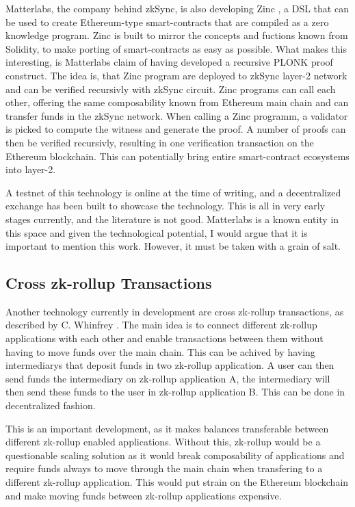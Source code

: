 \documentclass[../../thesis.tex]{subfiles}
\begin{document}
Matterlabs, the company behind zkSync, is also developing Zinc \cite{zinc}, a DSL that can be used to create Ethereum-type smart-contracts that are compiled as a zero knowledge program. Zinc is built to mirror the concepts and fuctions known from Solidity, to make porting of smart-contracts as easy as possible. What makes this interesting, is Matterlabs claim of having developed a recursive PLONK proof construct. The idea is, that Zinc program are deployed to zkSync layer-2 network and can be verified recursivly with zkSync circuit. Zinc programs can call each other, offering the same composability known from Ethereum main chain and can transfer funds in the zkSync network. When calling a Zinc programm, a validator is picked to compute the witness and generate the proof. A number of proofs can then be verified recursivly, resulting in one verification transaction on the Ethereum blockchain. This can potentially bring entire smart-contract ecosystems into layer-2.

A testnet of this technology is online at the time of writing, and a decentralized exchange \cite{zincCurve} has been built to showcase the technology. This is all in very early stages currently, and the literature is not good. Matterlabs is a known entity in this space and given the technological potential, I would argue that it is important to mention this work. However, it must be taken with a grain of salt. 


\subsection{Cross zk-rollup Transactions}\label{zk_to_zk_tx}
Another technology currently in development are cross zk-rollup transactions, as described by C. Whinfrey \cite{whinfrey2021hop}. The main idea is to connect different zk-rollup applications with each other and enable transactions between them without having to move funds over the main chain. This can be achived by having intermediarys that deposit funds in two zk-rollup application. A user can then send funds the intermediary on zk-rollup application A, the intermediary will then send these funds to the user in zk-rollup application B. This can be done in decentralized fashion. 

This is an important development, as it makes balances transferable between different zk-rollup enabled applications. Without this, zk-rollup would be a questionable scaling solution as it would break composability of applications and require funds always to move through the main chain when transfering to a different zk-rollup application. This would put strain on the Ethereum blockchain and make moving funds between zk-rollup applications expensive. 
\end{document}
